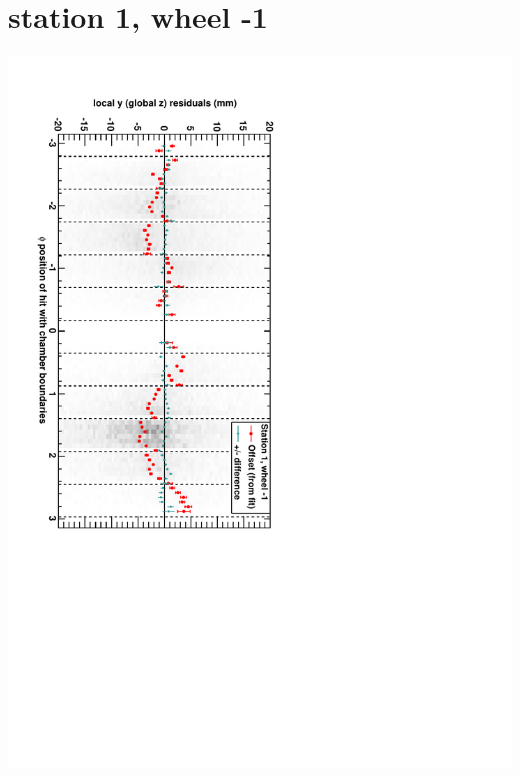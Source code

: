 \documentclass[compress]{beamer}
\begin{document}
\section*{station 1, wheel -1}
\begin{frame} \vfill \mbox{\hspace{-1 cm}\includegraphics[height=1.2\linewidth, angle=90]{DTzVsPhi_st1_whB.pdf}} \end{frame}
\end{document}
